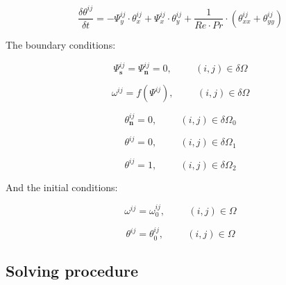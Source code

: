 \begin {equation} \label{ener4}
 \frac{\delta \theta^{ij}}{\delta t} =  -\Psi^{ij} _{y} \cdot 
 \theta^{ij}_x + \Psi^{ij} _{x} \cdot \theta^{ij}_y + \frac{1}{Re \cdot Pr}
 \cdot ( \theta^{ij}_{xx} + \theta^{ij}_{yy})
\end{equation}

The boundary conditions: 

\begin{equation} \label{BCs1}
 \Psi^{ij}_ \mathbf{s}= \Psi^{ij}_ \mathbf{n}=0, \hspace{1cm} (i,j)\in \delta
 \Omega
\end{equation}

\begin{equation} \label{BCs2}
 \omega^{ij} = f(\Psi^{ij}), \hspace{1cm} (i,j)\in \delta
 \Omega
\end{equation}

\begin{equation} \label{BCs3}
 \theta^{ij}_ \mathbf{n}=0, \hspace{1cm} (i,j)\in
 \delta \Omega_0
\end{equation}

\begin{equation} \label{BCs4}
 \theta^{ij} =0, \hspace{1cm} (i,j)\in
 \delta \Omega_1
\end{equation}

\begin{equation} \label{BCs5}
 \theta^{ij} =1, \hspace{1cm} (i,j)\in
 \delta \Omega_2
\end{equation}

And the initial conditions: 

\begin{equation} \label{IC1}
 \omega^{ij} = \omega^{ij}_0, \hspace{1cm} (i,j)\in  \Omega
\end{equation}

\begin{equation} \label{IC2}
 \theta^{ij} = \theta^{ij}_0, \hspace{1cm} (i,j)\in  \Omega
\end{equation}

\subsection{Solving procedure}

